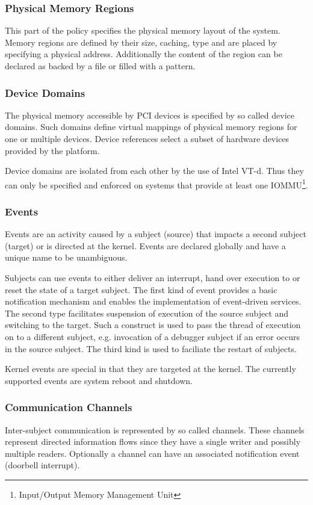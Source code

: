 \documentclass[a4paper,twoside,titlepage]{article}
\begin{document}
\subsubsection{Physical Memory Regions}
This part of the policy specifies the physical memory layout of the system.
Memory regions are defined by their size, caching, type and are placed by
specifying a physical address. Additionally the content of the region can be
declared as backed by a file or filled with a pattern.

\subsubsection{Device Domains}
The physical memory accessible by PCI devices is specified by so called device
domains. Such domains define virtual mappings of physical memory regions for one
or multiple devices. Device references select a subset of hardware devices
provided by the platform.

Device domains are isolated from each other by the use of Intel VT-d. Thus they
can only be specified and enforced on systems that provide at least one
IOMMU\footnote{Input/Output Memory Management Unit}.

\subsubsection{Events}
Events are an activity caused by a subject (source) that impacts a second
subject (target) or is directed at the kernel. Events are declared globally and
have a unique name to be unambiguous.

Subjects can use events to either deliver an interrupt, hand over execution to
or reset the state of a target subject. The first kind of event provides a
basic notification mechanism and enables the implementation of event-driven
services. The second type facilitates suspension of execution of the source
subject and switching to the target. Such a construct is used to pass the
thread of execution on to a different subject, e.g. invocation of a debugger
subject if an error occurs in the source subject. The third kind is used to
faciliate the restart of subjects.

Kernel events are special in that they are targeted at the kernel. The
currently supported events are system reboot and shutdown.

\subsubsection{Communication Channels}
Inter-subject communication is represented by so called channels. These channels
represent directed information flows since they have a single writer and
possibly multiple readers. Optionally a channel can have an associated
notification event (doorbell interrupt).
\end{document}
